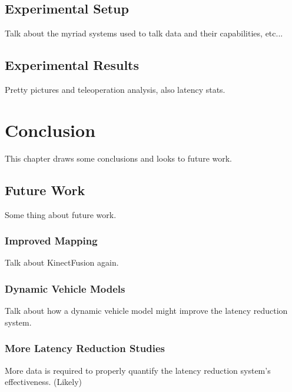 \documentclass[12pt]{report}
\begin{document}
\section{Experimental Setup}\label{sec:experimental_setup}
Talk about the myriad systems used to talk data and their capabilities, etc...

\section{Experimental Results}
Pretty pictures and teleoperation analysis, also latency stats.


\chapter{Conclusion}\label{chap:conclusion}
This chapter draws some conclusions and looks to future work.

\section{Future Work}
Some thing about future work.

\subsection{Improved Mapping}
Talk about KinectFusion again.

\subsection{Dynamic Vehicle Models}
Talk about how a dynamic vehicle model might improve the latency reduction system.

\subsection{More Latency Reduction Studies}
More data is required to properly quantify the latency reduction system's effectiveness.  (Likely)




\end{document}
